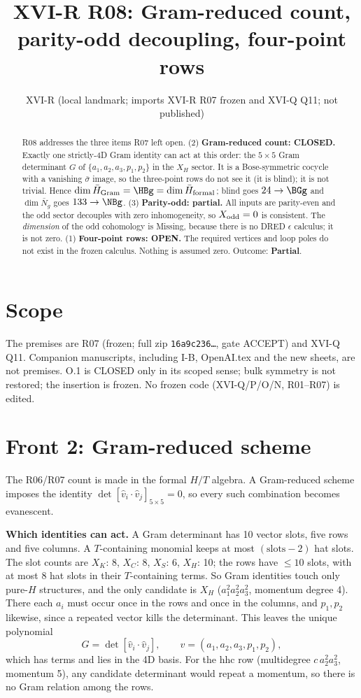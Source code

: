 \documentclass[11pt]{article}
\title{XVI-R R08: Gram-reduced count, parity-odd decoupling, four-point rows}
\author{XVI-R (local landmark; imports XVI-R R07 frozen and XVI-Q Q11; not published)}
\date{}
\begin{document}
\maketitle
\begin{abstract}
R08 addresses the three items R07 left open. (2) \textbf{Gram-reduced count: CLOSED.} Exactly one strictly-4D Gram
identity can act at this order: the $5\times5$ Gram determinant $G$ of $\{a_1,a_2,a_3,p_1,p_2\}$ in the $X_H$ sector. It is
a Bose-symmetric cocycle with a vanishing $\bar\sigma$ image, so the three-point rows do not see it (it is blind); it is
not trivial. Hence $\dim\bar H_{\rm Gram}=\HBg=\dim\bar H_{\rm formal}$; blind goes $24\to\BGg$ and $\dim\bar N_g$ goes
$133\to\NBg$. (3) \textbf{Parity-odd: partial.} All inputs are parity-even and the odd sector decouples with zero
inhomogeneity, so $X_{\rm odd}=0$ is consistent. The \emph{dimension} of the odd cohomology is Missing, because there is
no DRED $\epsilon$ calculus; it is not zero. (1) \textbf{Four-point rows: OPEN.} The required vertices and loop poles do
not exist in the frozen calculus. Nothing is assumed zero. Outcome: \textbf{Partial}.
\end{abstract}

\section{Scope}
The premises are R07 (frozen; full zip \texttt{16a9c236\ldots}, gate ACCEPT) and XVI-Q Q11. Companion manuscripts,
including I-B, OpenAI.tex and the new sheets, are not premises. O.1 is CLOSED only in its scoped sense; bulk symmetry is
not restored; the insertion is frozen. No frozen code (XVI-Q/P/O/N, R01--R07) is edited.

\section{Front 2: Gram-reduced scheme}
The R06/R07 count is made in the formal $H/T$ algebra. A Gram-reduced scheme imposes the identity
$\det[\hat v_i\cdot\hat v_j]_{5\times5}=0$, so every such combination becomes evanescent.

\textbf{Which identities can act.} A Gram determinant has 10 vector slots, five rows and five columns. A $T$-containing
monomial keeps at most $(\text{slots}-2)$ hat slots. The slot counts are $X_K$: 8, $X_C$: 8, $X_S$: 6, $X_H$: 10; the
rows have $\le10$ slots, with at most 8 hat slots in their $T$-containing terms. So Gram identities touch only pure-$H$
structures, and the only candidate is $X_H$ ($a_1^2a_2^2a_3^2$, momentum degree 4). There each $a_i$ must occur once in
the rows and once in the columns, and $p_1,p_2$ likewise, since a repeated vector kills the determinant. This leaves the
unique polynomial
$$G=\det[\hat v_i\cdot\hat v_j],\qquad v=(a_1,a_2,a_3,p_1,p_2),$$
which has \GT{} terms and lies in the 4D basis. For the hhc row (multidegree $c\,a_2^2a_3^2$, momentum 5), any candidate
determinant would repeat a momentum, so there is no Gram relation among the rows.
\end{document}
